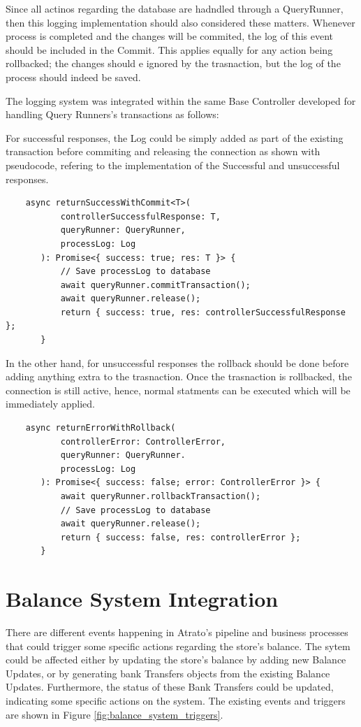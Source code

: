 Since all actinos regarding the database are hadndled through a QueryRunner, then this logging implementation should also considered these matters. Whenever process is completed and the changes will be commited, the log of this event should be included in the Commit. This applies equally for any action being rollbacked; the changes should e ignored by the trasnaction, but the log of the process should indeed be saved.

The logging system was integrated within the same Base Controller developed for handling Query Runners's transactions as follows:

For successful responses, the Log could be simply added as part of the existing transaction before commiting and releasing the connection as shown with pseudocode, refering to the implementation of the Successful and unsuccessful responses.

\begin{verbatim}
    async returnSuccessWithCommit<T>(
           controllerSuccessfulResponse: T,
           queryRunner: QueryRunner,
           processLog: Log
       ): Promise<{ success: true; res: T }> {
           // Save processLog to database
           await queryRunner.commitTransaction();
           await queryRunner.release();
           return { success: true, res: controllerSuccessfulResponse };
       }
\end{verbatim}

In the other hand, for unsuccessful responses the rollback should be done before adding anything extra to the trasnaction.  Once the trasnaction is rollbacked, the connection is still active, hence, normal statments can be executed which will be immediately applied.

\begin{verbatim}
    async returnErrorWithRollback(
           controllerError: ControllerError,
           queryRunner: QueryRunner.
           processLog: Log
       ): Promise<{ success: false; error: ControllerError }> {
           await queryRunner.rollbackTransaction();
           // Save processLog to database
           await queryRunner.release();
           return { success: false, res: controllerError };
       }
    \end{verbatim}

\section{Balance System Integration}

There are different events happening in Atrato's pipeline and business processes that could trigger some specific actions regarding the store's balance. The sytem could be affected either by updating the store's balance by adding new Balance Updates, or by generating bank Transfers objects from the existing Balance Updates. Furthermore, the status of these Bank Transfers could be updated, indicating some specific actions on the system. The existing events and triggers are shown in Figure \ref{fig:balance_system_triggers}.

